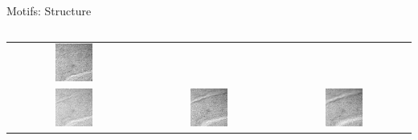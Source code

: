 \documentclass{beamer}
\begin{document}
\begin{frame}{Motifs: Structure}
\begin{columns}
\begin{tabular}{ccc}
\includegraphics[width=0.3\textwidth]{fracture2_z=75um.jpg}\\
\includegraphics[width=0.3\textwidth]{fracture2_z=90um.jpg}&%
\includegraphics[width=0.3\textwidth]{fracture2_z=105um.jpg}&%
\includegraphics[width=0.3\textwidth]{fracture2_z=120um.jpg}\\
\end{tabular} 
\begin{tikzpicture}[inner sep=0]

\end{tikzpicture}
\end{columns}
\end{frame}
\end{document}
